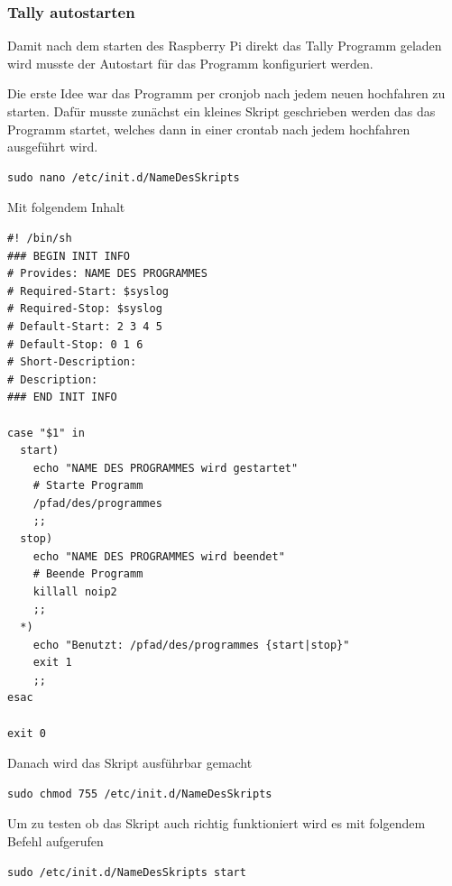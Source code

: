 \documentclass[11pt,a4paper]{article} %
\begin{document}
\subsubsection{Tally autostarten}
Damit nach dem starten des Raspberry Pi direkt das Tally Programm geladen wird musste der Autostart für das Programm konfiguriert werden.
\par
Die erste Idee war das Programm per cronjob nach jedem neuen hochfahren zu starten. Dafür musste zunächst ein kleines Skript geschrieben werden das das Programm startet, welches dann in einer crontab nach jedem hochfahren ausgeführt wird.
\begin{frame}

\begin{lstlisting}
sudo nano /etc/init.d/NameDesSkripts
\end{lstlisting}
\end{frame}
\newpage
Mit folgendem Inhalt
\begin{frame}

\begin{lstlisting}
#! /bin/sh
### BEGIN INIT INFO
# Provides: NAME DES PROGRAMMES
# Required-Start: $syslog
# Required-Stop: $syslog
# Default-Start: 2 3 4 5
# Default-Stop: 0 1 6
# Short-Description:
# Description:
### END INIT INFO
 
case "$1" in
  start)
    echo "NAME DES PROGRAMMES wird gestartet"
    # Starte Programm
    /pfad/des/programmes
    ;;
  stop)
    echo "NAME DES PROGRAMMES wird beendet"
    # Beende Programm
    killall noip2
    ;;
  *)
    echo "Benutzt: /pfad/des/programmes {start|stop}"
    exit 1
    ;;
esac
 
exit 0
\end{lstlisting}
\end{frame}

Danach wird das Skript ausführbar gemacht
\begin{frame}

\begin{lstlisting}
sudo chmod 755 /etc/init.d/NameDesSkripts
\end{lstlisting}
\end{frame}
Um zu testen ob das Skript auch richtig funktioniert wird es mit folgendem Befehl aufgerufen
\begin{frame}

\begin{lstlisting}
sudo /etc/init.d/NameDesSkripts start
\end{lstlisting}
\end{frame}
\end{document}
